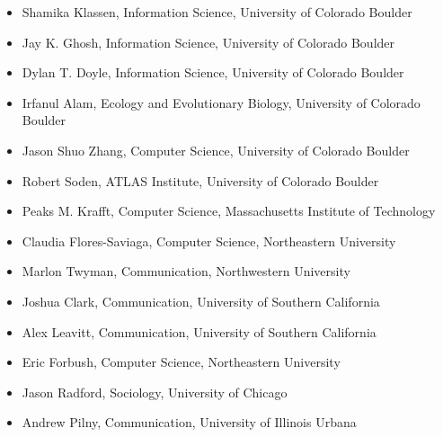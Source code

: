 \documentclass{cv}
\begin{document}
	\begin{itemize}
		\item Shamika Klassen, Information Science, University of Colorado Boulder
		\item Jay K. Ghosh, Information Science, University of Colorado Boulder
		\item Dylan T. Doyle, Information Science, University of Colorado Boulder
		\item Irfanul Alam, Ecology and Evolutionary Biology, University of Colorado Boulder
		\item Jason Shuo Zhang, Computer Science, University of Colorado Boulder
		\item Robert Soden, ATLAS Institute, University of Colorado Boulder
		\item Peaks M. Krafft, Computer Science, Massachusetts Institute of Technology
		\item Claudia Flores-Saviaga, Computer Science, Northeastern University
		\item Marlon Twyman, Communication, Northwestern University
		\item Joshua Clark, Communication, University of Southern California
		\item Alex Leavitt, Communication, University of Southern California
		\item Eric Forbush, Computer Science, Northeastern University
		\item Jason Radford, Sociology, University of Chicago
		\item Andrew Pilny, Communication, University of Illinois Urbana
	\end{itemize}
\end{document}
